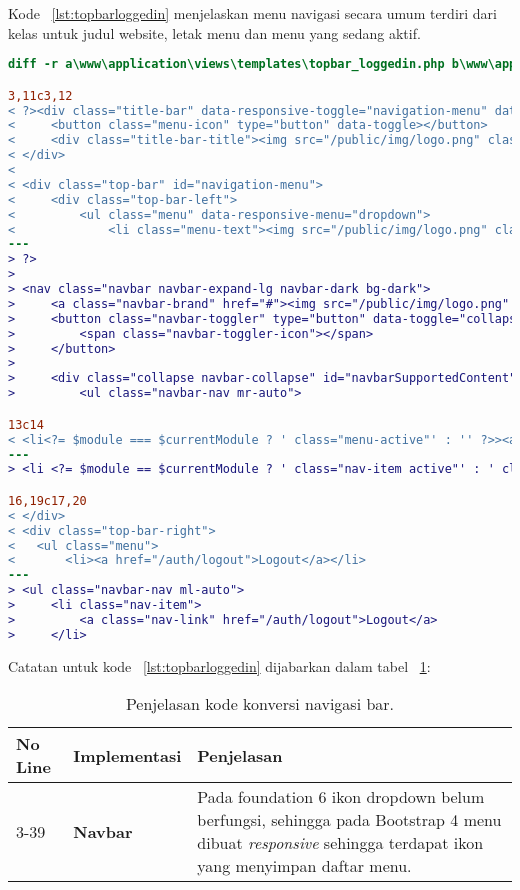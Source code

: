 Kode ~\ref{lst:topbarloggedin} menjelaskan menu navigasi secara umum terdiri dari kelas untuk judul website, letak menu dan menu yang sedang aktif.
\begin{lstlisting}[language=diff, caption=Perubahan file \path{\views\templates\topbar_loggedin.php} ,  basicstyle=\ttfamily, frame=single,
columns=fullflexible, keepspaces=true, breaklines=true, label={lst:topbarloggedin}]
diff -r a\www\application\views\templates\topbar_loggedin.php b\www\application\views\templates\topbar_loggedin.php

3,11c3,12
< ?><div class="title-bar" data-responsive-toggle="navigation-menu" data-hide-for="medium">
<     <button class="menu-icon" type="button" data-toggle></button>
<     <div class="title-bar-title"><img src="/public/img/logo.png" class="textsized" alt="B"/></div>
< </div>
< 
< <div class="top-bar" id="navigation-menu">
<     <div class="top-bar-left">
<         <ul class="menu" data-responsive-menu="dropdown">
<             <li class="menu-text"><img src="/public/img/logo.png" class="textsized" alt="B"/></li>
---
> ?>
> 
> <nav class="navbar navbar-expand-lg navbar-dark bg-dark">
>     <a class="navbar-brand" href="#"><img src="/public/img/logo.png" width="50"/></a>
>     <button class="navbar-toggler" type="button" data-toggle="collapse" data-target="#navbarSupportedContent" aria-controls="navbarSupportedContent" aria-expanded="false" aria-label="Toggle navigation">
>         <span class="navbar-toggler-icon"></span>
>     </button>
> 
>     <div class="collapse navbar-collapse" id="navbarSupportedContent">
>         <ul class="navbar-nav mr-auto">

13c14
< <li<?= $module === $currentModule ? ' class="menu-active"' : '' ?>><a href="/<?= $module ?>"><?= $this->config->item('module-names')[$module] ?></a></li>
---
> <li <?= $module == $currentModule ? ' class="nav-item active"' : ' class="nav-item "' ?>><a class="nav-link" href="/<?= $module ?>"><?= $this->config->item('module-names')[$module] ?></a></li>

16,19c17,20
< </div>
< <div class="top-bar-right">
< 	<ul class="menu">
< 	    <li><a href="/auth/logout">Logout</a></li>
---
> <ul class="navbar-nav ml-auto">
>     <li class="nav-item">
>         <a class="nav-link" href="/auth/logout">Logout</a>
>     </li>
\end{lstlisting}

\noindent Catatan untuk kode ~\ref{lst:topbarloggedin} dijabarkan dalam tabel ~\ref{tabel:KodeLogin}:
\begin{table}[H]
	\centering
	\caption{Penjelasan kode konversi navigasi bar.}
	\begin{tabularx}{\textwidth}{llX}
		\toprule
		No Line & Implementasi     & Penjelasan \\
		\midrule
		3-39 & \textbf{Navbar} & Pada foundation 6 ikon dropdown belum berfungsi, sehingga pada Bootstrap 4 menu dibuat \textit{responsive} sehingga terdapat ikon yang menyimpan daftar menu.\\
		\bottomrule
	\end{tabularx}%
	\label{tabel:KodeLogin}
\end{table}

